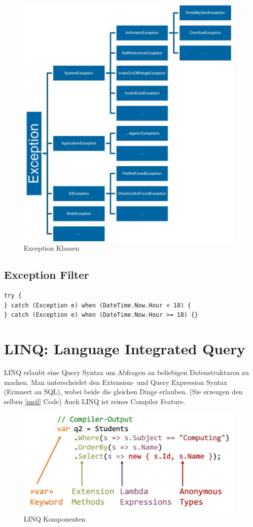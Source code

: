 \begin{figure}[h]
	\centering
	\includegraphics[width=0.5\linewidth]{images/exception_classes}
	\caption{Exception Klassen}
	\label{fig:exceptionclasses}
\end{figure}

\subsection{Exception Filter}
\begin{lstlisting}
try {
} catch (Exception e) when (DateTime.Now.Hour < 18) {
} catch (Exception e) when (DateTime.Now.Hour >= 18) {}
\end{lstlisting}


\section{LINQ: Language Integrated Query}
LINQ erlaubt eine Query Syntax um Abfragen an beliebigen Datenstrukturen zu machen. Man unterscheidet den Extension- und Query Expression Syntax (Erinnert an SQL), wobei beide die gleichen Dinge erlauben. (Sie erzeugen den selben \ref{msil} Code) Auch LINQ ist reines Compiler Feature.

\begin{figure}[h]
\centering
\includegraphics[width=0.7\linewidth]{images/linq_components}
\caption{LINQ Komponenten}
\label{fig:linqcomponents}
\end{figure}


